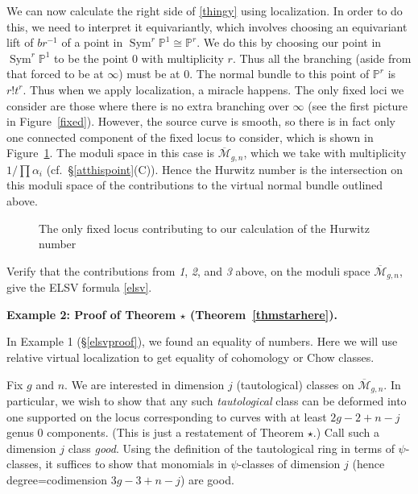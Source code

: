 \documentclass[12pt,letterpaper]{amsart}
\newcommand{\bpoint}[1]{\vspace{3mm}\par \noindent \refstepcounter{subsection}{\bf \thesubsection.} 
  {\bf #1.} }
\newcommand{\proj}{\mathbb P}
\newcommand{\cm}{{\mathcal{M}}}
\newcommand{\cmbar}{\overline{\cm}}
\newcommand{\al}{\alpha}
\newcommand{\Sym}{\operatorname{Sym}}
\newcommand{\lremind}[1]{{\bf[label:  #1]}}
\renewcommand{\lremind}[1]{{}}
\begin{document}
{We can now calculate the right side of \eqref{thingy} using localization.
In order to do this, we need to interpret it equivariantly,
which involves choosing an equivariant lift of $br^{-1}$ of a point
in $\Sym^r \proj^1 \cong \proj^r$.  We do this by choosing our point
in $\Sym^r \proj^1$ to be the point $0$ with multiplicity $r$.
Thus all the branching (aside from that forced to be at $\infty$) 
must be at $0$.  The normal bundle to this point of $\proj^r$ 
is $r! t^r$.  Thus when we apply localization, a miracle happens.
The only fixed loci we consider are those where there is no extra branching
over $\infty$ (see the first picture in Figure~\ref{fixed}).  However, the source curve is smooth, so there is in fact only one connected
component of the fixed locus to consider, which is shown in Figure~\ref{elsvfixed}.
The moduli space in this case is $\cmbar_{g,n}$, which we
take with multiplicity $1/ \prod \al_i$ (cf.\ \S \ref{atthispoint}(C)).
Hence the Hurwitz number is the intersection on this moduli space
of the contributions to the virtual normal bundle outlined above.
\begin{figure}
\begin{center}

\end{center}
\caption{The only fixed locus contributing to our calculation of the Hurwitz number
\lremind{elsvfixed}}\label{elsvfixed}
\end{figure}

  Verify that the contributions from {\em 1},
{\em 2}, and {\em 3} above, on the moduli space $\cmbar_{g,n}$, give the
ELSV formula \eqref{elsv}.

\bpoint{Example 2:  Proof of Theorem $\star$ (Theorem~\ref{thmstarhere})}\label{thmstarpf}\lremind{thmstarpf}

In Example 1 (\S \ref{elsvproof}), we found an equality of numbers.  Here we
will use relative virtual localization to get equality of cohomology
or Chow classes.

Fix $g$ and $n$.  We are interested in dimension $j$ (tautological)
classes on $\cmbar_{g,n}$.  In particular, we wish to show that any
such {\em tautological} class can be deformed into one supported on the locus
corresponding to curves with at least $2g-2+n-j$ genus $0$ components.
(This is just a restatement of Theorem $\star$.)
Call such a dimension $j$ class {\em good}.
Using the definition of the tautological ring in terms of $\psi$-classes,
it suffices to show that monomials in $\psi$-classes of dimension $j$
(hence degree=codimension $3g-3+n-j$) are good.

}
\end{document}
